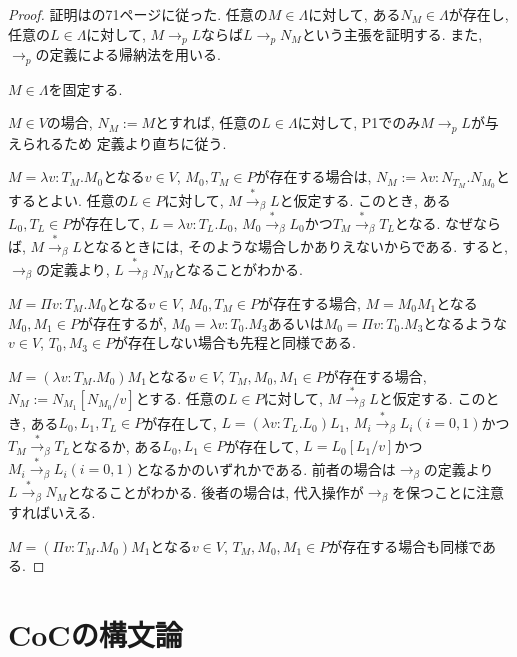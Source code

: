 \documentclass{ltjsarticle}
\begin{document}
\begin{proof}
 証明は\cite{高橋正子1991計算論}の71ページに従った.
任意の$M \in \Lambda$に対して, ある$N_M \in \Lambda$が存在し, 任意の$L \in \Lambda$に対して, $M \rightarrow_p L$ならば$L \rightarrow_p N_M$という主張を証明する.
また, $\rightarrow_{p}$の定義による帰納法を用いる.

$M \in \Lambda$を固定する.

$M \in V$の場合, $N_M := M$とすれば, 任意の$L \in \Lambda$に対して, P1でのみ$M \rightarrow_p L$が与えられるため
定義より直ちに従う.

$M = \lambda v \colon T_M . M_0$となる$v \in V$, $M_0, T_M \in P$が存在する場合は, $N_M := \lambda v \colon N_{T_M} . N_{M_0}$とするとよい.
任意の$L \in P$に対して, $M \overset{*}{\rightarrow}_\beta L$と仮定する.
このとき, ある$L_0, T_L \in P$が存在して, $L = \lambda v \colon T_L . L_0$, $M_0 \overset{*}{\rightarrow}_\beta L_0$かつ$T_M \overset{*}{\rightarrow}_\beta T_L$となる.
なぜならば, $M \overset{*}{\rightarrow}_\beta L$となるときには, そのような場合しかありえないからである.
すると, $\rightarrow_{\beta}$の定義より, $L \overset{*}{\rightarrow}_\beta N_M$となることがわかる.

$M = \Pi v \colon T_M . M_0$となる$v \in V$, $M_0, T_M \in P$が存在する場合, 
$M = M_0 M_1$となる$M_0, M_1 \in P$が存在するが, $M_0 = \lambda v \colon T_0 . M_3$あるいは$M_0 = \Pi v \colon T_0 . M_3$となるような$v \in V$, $T_0, M_3 \in P$が存在しない場合も先程と同様である.

$M = (\lambda v : T_M . M_0) M_1$となる$v \in V$, $T_M, M_0, M_1 \in P$が存在する場合, $N_M := N_{M_1}[N_{M_0}/v]$とする.
任意の$L \in P$に対して, $M \overset{*}{\rightarrow}_\beta L$と仮定する.
このとき, ある$L_0, L_1, T_L \in P$が存在して, $L = (\lambda v \colon T_L . L_0) L_1$, $M_i \overset{*}{\rightarrow}_\beta L_i (i = 0, 1)$かつ$T_M \overset{*}{\rightarrow}_\beta T_L$となるか,
ある$L_0, L_1 \in P$が存在して, $L = L_0[L_1/v]$かつ$M_i \overset{*}{\rightarrow}_\beta L_i (i = 0, 1)$となるかのいずれかである.
前者の場合は$\rightarrow_{\beta}$の定義より$L \overset{*}{\rightarrow}_\beta N_M$となることがわかる.
後者の場合は, 代入操作が$\rightarrow_{\beta}$を保つことに注意すればいえる.

$M = (\Pi v : T_M . M_0) M_1$となる$v \in V$, $T_M, M_0, M_1 \in P$が存在する場合も同様である.
\end{proof}


\section{CoCの構文論}
\end{document}
